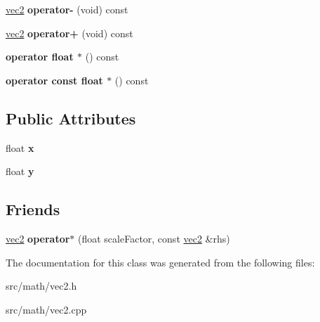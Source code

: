 \begin{DoxyCompactItemize}
\item 
\hypertarget{classmath_1_1vec2_a4be171c89cff623c2b0b18b7be40ae23}{
\hyperlink{classmath_1_1vec2}{vec2} {\bfseries operator-\/} (void) const }
\label{classmath_1_1vec2_a4be171c89cff623c2b0b18b7be40ae23}

\item 
\hypertarget{classmath_1_1vec2_a22cfaea6a72989d8f7f8af0ec844d289}{
\hyperlink{classmath_1_1vec2}{vec2} {\bfseries operator+} (void) const }
\label{classmath_1_1vec2_a22cfaea6a72989d8f7f8af0ec844d289}

\item 
\hypertarget{classmath_1_1vec2_a7be6b451225a1150fef379646cfdc367}{
{\bfseries operator float $\ast$} () const }
\label{classmath_1_1vec2_a7be6b451225a1150fef379646cfdc367}

\item 
\hypertarget{classmath_1_1vec2_ac29d4a4d408660c2347653cd6e3aadd0}{
{\bfseries operator const float $\ast$} () const }
\label{classmath_1_1vec2_ac29d4a4d408660c2347653cd6e3aadd0}

\end{DoxyCompactItemize}
\subsection*{Public Attributes}
\begin{DoxyCompactItemize}
\item 
\hypertarget{classmath_1_1vec2_a80b10d5dce55f531250dc88c9afd2d2b}{
float {\bfseries x}}
\label{classmath_1_1vec2_a80b10d5dce55f531250dc88c9afd2d2b}

\item 
\hypertarget{classmath_1_1vec2_aec0b4a209674ce9a5fba6f76f514f777}{
float {\bfseries y}}
\label{classmath_1_1vec2_aec0b4a209674ce9a5fba6f76f514f777}

\end{DoxyCompactItemize}
\subsection*{Friends}
\begin{DoxyCompactItemize}
\item 
\hypertarget{classmath_1_1vec2_ad09d5f99b2aefd8098e5a6cdf7bcb3f9}{
\hyperlink{classmath_1_1vec2}{vec2} {\bfseries operator$\ast$} (float scaleFactor, const \hyperlink{classmath_1_1vec2}{vec2} \&rhs)}
\label{classmath_1_1vec2_ad09d5f99b2aefd8098e5a6cdf7bcb3f9}

\end{DoxyCompactItemize}


The documentation for this class was generated from the following files:\begin{DoxyCompactItemize}
\item 
src/math/vec2.h\item 
src/math/vec2.cpp\end{DoxyCompactItemize}
